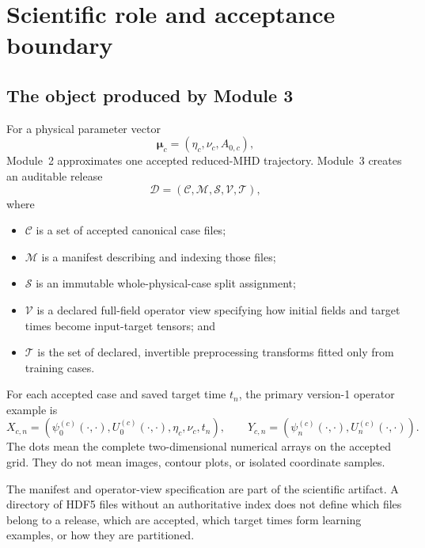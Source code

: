 \documentclass[11pt]{article}
\newcommand{\vect}[1]{\bm{#1}}
\begin{document}
\ProjectTOC
\clearpage
{}

\section{Scientific role and acceptance boundary}
\label{sec:role}

\subsection{The object produced by Module 3}

For a physical parameter vector
\begin{equation}
\vect{\mu}_c=(\eta_c,\nu_c,A_{0,c}),
\end{equation}
Module~2 approximates one accepted reduced-MHD trajectory. Module~3 creates an auditable release
\begin{equation}
\mathcal D=\left(\mathcal C,\mathcal M,\mathcal S,\mathcal V,\mathcal T\right),
\label{eq:dataset_object}
\end{equation}
where
\begin{itemize}
  \item $\mathcal C$ is a set of accepted canonical case files;
  \item $\mathcal M$ is a manifest describing and indexing those files;
  \item $\mathcal S$ is an immutable whole-physical-case split assignment;
  \item $\mathcal V$ is a declared full-field operator view specifying how initial fields and target times become input-target tensors; and
  \item $\mathcal T$ is the set of declared, invertible preprocessing transforms fitted only from training cases.
\end{itemize}

For each accepted case and saved target time $t_n$, the primary version-1 operator example is
\begin{equation}
X_{c,n}=\left(\psi^{(c)}_0(\cdot,\cdot),U^{(c)}_0(\cdot,\cdot),\eta_c,\nu_c,t_n\right),
\qquad
Y_{c,n}=\left(\psi^{(c)}_n(\cdot,\cdot),U^{(c)}_n(\cdot,\cdot)\right).
\label{eq:operator_example}
\end{equation}
The dots mean the complete two-dimensional numerical arrays on the accepted grid. They do not mean images, contour plots, or isolated coordinate samples.

The manifest and operator-view specification are part of the scientific artifact. A directory of HDF5 files without an authoritative index does not define which files belong to a release, which are accepted, which target times form learning examples, or how they are partitioned.
\end{document}
